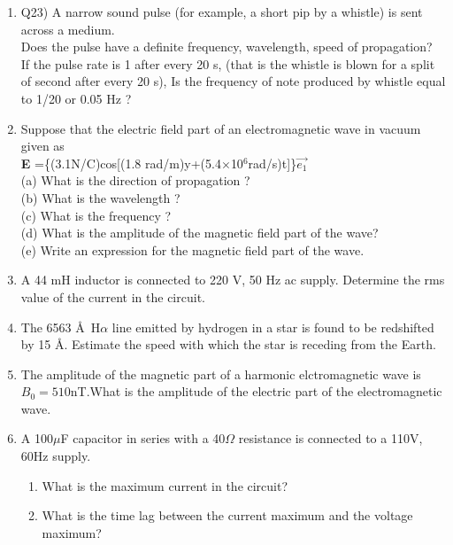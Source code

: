 \begin{enumerate}[label=\thesection.\arabic*,ref=\thesection.\theenumi]
\item Q23) A narrow sound pulse (for example, a short pip by a whistle) is sent across a
	medium.\\  Does the pulse have a definite  frequency,  wavelength,  speed
	of propagation?\\[1ex] If the pulse rate is 1 after every 20 s, (that is the whistle is
	blown for a split of second after every 20 s), Is the frequency of note produced
	by whistle equal to 1/20 or 0.05 Hz ?\\
\solution
\pagebreak
\item Suppose that the electric field part of an electromagnetic wave in vacuum given as\\ \textbf{E} =\{(3.1N/C)cos[(1.8 rad/m)y+(5.4$\times$10$^{6}$rad/s)t]\}$\vec{e_1}$ \\
(a) What is the direction of propagation ?\\
(b) What is the wavelength ? \\
(c) What is the frequency ?\\
(d) What is the amplitude of the magnetic field part of the wave?\\
(e) Write an expression for the magnetic field part of the wave.\\
\solution

\pagebreak

\item A 44 mH inductor is connected to 220 V, 50 Hz ac supply. Determine
the rms value of the current in the circuit.\\
\solution

\pagebreak

\item The 6563 \AA\, H$\alpha$ line emitted by hydrogen in a star is found to be redshifted by 15 \AA. Estimate the speed with which the star is receding from the Earth.
\solution
\pagebreak
\item The amplitude  of the magnetic part of a harmonic elctromagnetic wave is $B_0=510$nT.What is the amplitude of the electric part of the electromagnetic wave.\\
\solution

\pagebreak

\item A 100$\mu$F capacitor in series with a 40$\Omega$ resistance is connected to a 110V, 60Hz supply.
\begin{enumerate}[label = {\brak{\alph*}}]
\item What is the maximum current in the circuit?
\item What is the time lag between the current maximum and the voltage maximum?\\
\end{enumerate}
\solution

\pagebreak


\end{enumerate}
